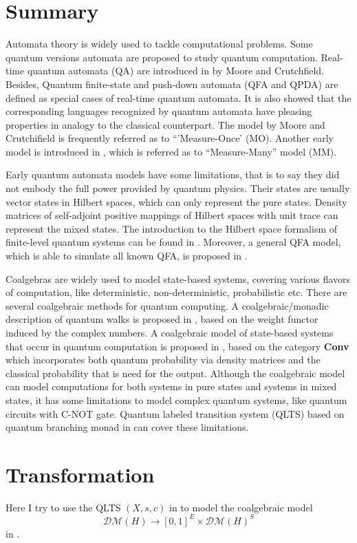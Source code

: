 \documentclass{llncs}
\begin{document}
\section{Summary}
Automata theory is widely used to tackle computational problems. Some quantum versions automata are proposed to study quantum computation. Real-time quantum automata (QA) are introduced in \cite{CJ00} by Moore and Crutchfield. Besides, Quantum finite-state and push-down automata (QFA and QPDA) are defined as special cases of real-time quantum automata. It is also showed that the corresponding languages recognized by quantum automata have pleasing properties in analogy to the classical counterpart. The model by Moore and Crutchifield is frequently referred as to ``'Measure-Once' (MO). Another early model is introduced in \cite{AJ97}, which is referred as to ``Measure-Many'' model (MM).

Early quantum automata models have some limitations, that is to say they did not embody the full power provided by quantum physics. Their states are usually vector states in Hilbert spaces, which can only represent the pure states. Density matrices of self-adjoint positive mappings of Hilbert spaces with unit trace can represent the mixed states. The introduction to the Hilbert space formalism of finite-level quantum systems can be found in \cite{M11}. Moreover, a general QFA model, which is able to simulate all known QFA, is proposed in \cite{AA14}.

Coalgebras are widely used to model state-based systems, covering various flavors of computation, like deterministic, non-deterministic, probabilistic etc. There are several coalgebraic methods for quantum computing. A coalgebraic/monadic description of quantum walks is proposed in \cite{B11}, based on the weight functor induced by the complex numbers. A coalgebraic model of state-based systems that occur in quantum computation is proposed in \cite{F12}, based on the category \textbf{Conv} which incorporates both quantum probability via density matrices and the classical probability that is need for the output. Although the coalgebraic model can model computations for both systems in pure states and systems in mixed states, it has some limitations to model complex quantum systems, like quantum circuits with C-NOT gate. Quantum labeled transition system (QLTS) based on quantum branching monad in \cite{H14} can cover these limitations. 

\section{Transformation}
Here I try to use the QLTS $(X,s,c)$ in \cite{H14} to model the coalgebraic model $$\mathcal{DM}(H)\rightarrow [0,1]^{E}\times \mathcal{DM}(H)^{S}$$ in \cite{F12}.
\end{document}
